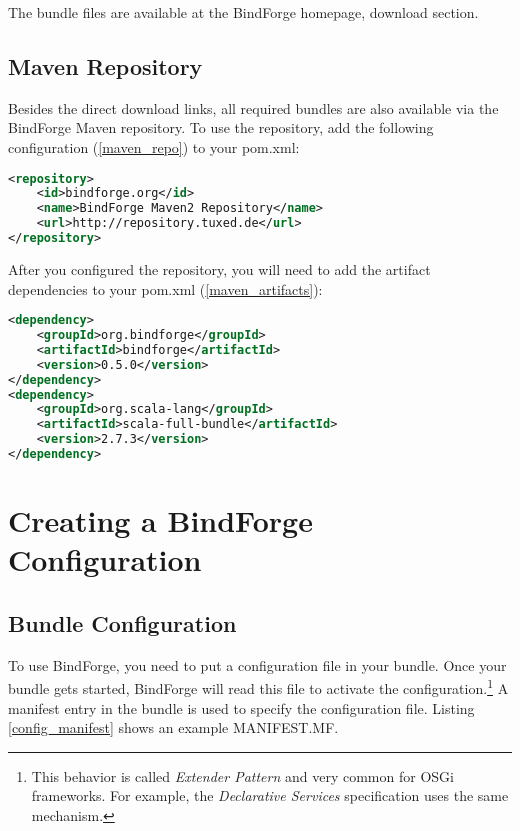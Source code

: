The bundle files are available at the BindForge homepage, download section.

\subsection{Maven Repository}

Besides the direct download links, all required bundles are also available via the BindForge Maven repository. To use the repository, add the following configuration (\ref{maven_repo}) to your pom.xml:

\begin{lstlisting}[caption={BindForge Maven Repository},label=maven_repo,language=xml]
<repository>
    <id>bindforge.org</id>
    <name>BindForge Maven2 Repository</name>
    <url>http://repository.tuxed.de</url>
</repository>
\end{lstlisting}

After you configured the repository, you will need to add the artifact dependencies to your pom.xml (\ref{maven_artifacts}):

\begin{lstlisting}[caption={BindForge Artifacts},label=maven_artifacts,language=xml]
<dependency>
	<groupId>org.bindforge</groupId>
	<artifactId>bindforge</artifactId>
	<version>0.5.0</version>
</dependency>
<dependency>
	<groupId>org.scala-lang</groupId>
	<artifactId>scala-full-bundle</artifactId>
	<version>2.7.3</version>
</dependency>
\end{lstlisting}


\section{Creating a BindForge Configuration}

\subsection{Bundle Configuration}

To use BindForge, you need to put a configuration file in your bundle. Once your bundle gets started, BindForge will read this file to activate the configuration.\footnote{This behavior is called \textit{Extender Pattern} and very common for OSGi frameworks. For example, the \textit{Declarative Services} specification uses the same mechanism.} A manifest entry in the bundle is used to specify the configuration file. Listing \ref{config_manifest} shows an example MANIFEST.MF.

